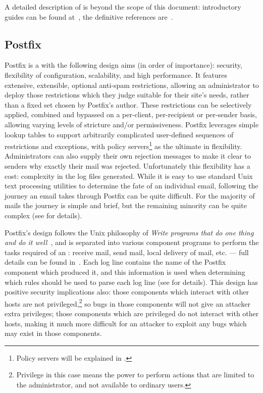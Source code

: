 A detailed description of \SMTP{} is beyond the scope of this document:
introductory guides can be found at~\cite{smtp-intro-01, smtp-intro-02},
the definitive references are~\cite{RFC821, RFC2821}.

\subsection{Postfix}

\label{postfix background}

Postfix is a \MTA{} with the following design aims (in order of
importance): security, flexibility of configuration, scalability, and high
performance.  It features extensive, extensible, optional anti-spam
restrictions, allowing an administrator to deploy those restrictions which
they judge suitable for their site's needs, rather than a fixed set chosen
by Postfix's author.  These restrictions can be selectively applied,
combined and bypassed on a per-client, per-recipient or per-sender basis,
allowing varying levels of stricture and/or permissiveness.  Postfix
leverages simple lookup tables to support arbitrarily complicated
user-defined sequences of restrictions and exceptions, with policy
servers\footnote{Policy servers will be explained in .} as the ultimate in flexibility.  Administrators can also supply
their own rejection messages to make it clear to senders why exactly their
mail was rejected.  Unfortunately this flexibility has a cost: complexity
in the log files generated.  While it is easy to use standard Unix text
processing utilities to determine the fate of an individual email,
following the journey an email takes through Postfix can be quite
difficult.  For the majority of mails the journey is simple and brief, but
the remaining minority can be quite complex (see  for details).

Postfix's design follows the Unix philosophy of \textit{Write programs that
do one thing and do it well\/}~\cite{unix-philosophy}, and is separated
into various component programs to perform the tasks required of an
\MTA{}\@: receive mail, send mail, local delivery of mail, etc. --- full
details can be found in~\cite{postfix-overview}.  Each log line contains
the name of the Postfix component which produced it, and this information
is used when determining which rules should be used to parse each log line
(see  for details).  This design has
positive security implications also: those components which interact with
other hosts are not privileged,\footnote{Privilege in this case means the
power to perform actions that are limited to the administrator, and not
available to ordinary users.} so bugs in those components will not give an
attacker extra privileges; those components which are privileged do not
interact with other hosts, making it much more difficult for an attacker to
exploit any bugs which may exist in those components.

